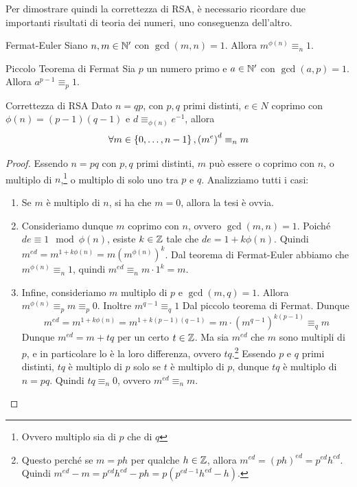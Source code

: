 Per dimostrare quindi la correttezza di RSA, è necessario ricordare due importanti risultati di teoria dei numeri, uno conseguenza dell'altro.

\begin{theorem}{Fermat-Euler}
  Siano \(n,m \in \mathbb{N}'\) con \(\gcd(m,n) = 1\).
  Allora \(m^{\phi(n)} \equiv_{n} 1\).
\end{theorem}

\begin{theorem}{Piccolo Teorema di Fermat}
  Sia \(p\) un numero primo e \(a \in \mathbb{N}'\) con \(\gcd(a,p) = 1\).
  Allora \(a^{p-1} \equiv_{p} 1\).
\end{theorem}

\begin{proposition}{Correttezza di RSA}
  Dato \(n = q p\), con \(p,q\) primi distinti, \(e \in N\) coprimo con \(\phi(n) = (p-1)(q-1)\) e \(d \equiv_{\phi(n)} e^{-1}\), allora
  \[\forall m \in \set{0,\ldots,n-1}, {(m^e)}^d \equiv_{n} m \]
\end{proposition}

\begin{proof}
  Essendo \(n = pq\) con \(p,q\) primi distinti, \(m\) può essere o coprimo con \(n\), o multiplo di \(n\),\footnote{Ovvero multiplo sia di \(p\) che di \(q\)} o multiplo di solo uno tra \(p\) e \(q\).
  Analizziamo tutti i casi:
  \begin{enumerate}
    \item Se \(m\) è multiplo di \(n\), si ha che \(m = 0\), allora la tesi è ovvia.
    \item Consideriamo dunque \(m\) coprimo con \(n\), ovvero \(\gcd(m,n) = 1\).
      Poiché \(d e \equiv 1 \mod \phi(n)\), esiste \(k \in \mathbb{Z}\) tale che \(d e = 1 + k \phi(n)\).
      Quindi \(m^{ed} = m^{1 + k\phi(n)} = m{(m^{\phi(n)})}^k\).
      Dal teorema di Fermat-Euler abbiamo che \(m^{\phi(n)} \equiv_n 1\), quindi \(m^{ed} \equiv_n m \cdot 1^k = m\).
    \item Infine, consideriamo \(m\) multiplo di \(p\) e \(\gcd(m,q) = 1\).
      Allora \(m^{\phi(n)} \equiv_p m \equiv_p 0\).
      Inoltre \(m^{q-1} \equiv_q 1\) Dal piccolo teorema di Fermat. Dunque
      \[m^{ed} = m^{1+k\phi(n)} = m^{1+k(p-1)(q-1)} = m\cdot{(m^{q-1})}^{k(p-1)}\equiv_q m\]
      Dunque \(m^{ed} = m+tq\) per un certo \(t \in \mathbb{Z}\).
      Ma sia \(m^{ed}\) che \(m\) sono multipli di \(p\), e in particolare lo è la loro differenza, ovvero \(tq\).\footnote{Questo perché se \(m = ph\) per qualche \(h\in\mathbb{Z}\), allora \(m^{ed} = {(p h)}^{ed} = p^{ed} h^{ed}\). Quindi \(m^{ed} - m = p^{ed} h^{ed} - p h = p(p^{ed-1} h^{ed} - h)\).}
      Essendo \(p\) e \(q\) primi distinti, \(tq\) è multiplo di \(p\) solo se \(t\) è multiplo di \(p\), dunque \(tq\) è multiplo di \(n = pq\).
      Quindi \(tq \equiv_n 0\), ovvero \(m^{ed} \equiv_n m\).
  \end{enumerate}
\end{proof}

